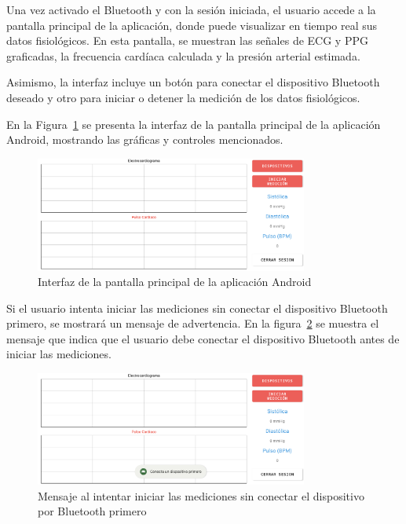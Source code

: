     Una vez activado el Bluetooth y con la sesión iniciada, el usuario accede a la pantalla principal de la aplicación, donde puede visualizar en tiempo real sus datos fisiológicos. En esta pantalla, se muestran las señales de ECG y PPG graficadas, la frecuencia cardíaca calculada y la presión arterial estimada.

    Asimismo, la interfaz incluye un botón para conectar el dispositivo Bluetooth deseado y otro para iniciar o detener la medición de los datos fisiológicos.

    En la Figura~\ref{fig:Android_PantallaPrincipal} se presenta la interfaz de la pantalla principal de la aplicación Android, mostrando las gráficas y controles mencionados.

    \begin{figure}[H]
        \centering
        \includegraphics[width=0.8\textwidth]{img/Resultados/android_pantallaPrincipal.png}
        \caption[Interfaz de la pantalla principal de la aplicación Android.]{Interfaz de la pantalla principal de la aplicación Android\footnotemark}
        \label{fig:Android_PantallaPrincipal}
    \end{figure}

    Si el usuario intenta iniciar las mediciones sin conectar el dispositivo Bluetooth primero, se mostrará un mensaje de advertencia. En la figura~\ref{fig:Android_ConectarDispPrimero} se muestra el mensaje que indica que el usuario debe conectar el dispositivo Bluetooth antes de iniciar las mediciones.

    \begin{figure}[H]
        \centering
        \includegraphics[width=0.8\textwidth]{img/Resultados/android_conectarDispPrimero.png}
        \caption[Mensaje al intentar iniciar las mediciones sin conectar el dispositivo por Bluetooth primero.]{Mensaje al intentar iniciar las mediciones sin conectar el dispositivo por Bluetooth primero\footnotemark}
        \label{fig:Android_ConectarDispPrimero}
    \end{figure}


